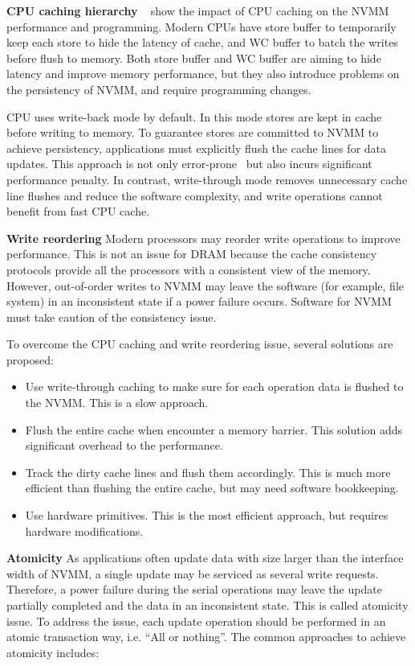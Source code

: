 \textbf{CPU caching hierarchy}
~\cite{CPUcaching} show the impact of CPU caching on the NVMM performance
and programming. Modern CPUs have store buffer to temporarily keep each store
to hide the latency of cache, and WC buffer to batch the writes before
flush to memory. Both store buffer and WC buffer are aiming to hide latency
and improve memory performance, but they also introduce problems on the
persistency of NVMM, and require programming changes.

CPU uses write-back mode by default. In this mode stores are kept in cache
before writing to memory. To guarantee stores are committed to NVMM to achieve
persistency, applications must explicitly flush the cache lines for data
updates. This approach is not only error-prone~\cite{singlelock}
but also incurs significant
performance penalty. In contrast, write-through mode removes unnecessary
cache line flushes and reduce the software complexity, and write operations
cannot benefit from fast CPU cache.

\textbf{Write reordering} Modern processors may reorder write operations to improve
performance. This is not an issue for DRAM because the cache consistency
protocols provide all the processors with a consistent view of the memory.
However, out-of-order writes to NVMM may leave the software (for example,
file system) in an inconsistent state if a power failure occurs. Software
for NVMM must take caution of the consistency issue. 

To overcome the CPU caching and write reordering issue,
several solutions are proposed:

\begin{itemize}
\item Use write-through caching to make sure for each operation
data is flushed to the NVMM. This is a slow approach. 
\item Flush the entire cache when encounter a memory barrier. This solution
adds significant overhead to the performance.
\item Track the dirty cache lines and flush them accordingly. This is much
more efficient than flushing the entire cache, but may need software bookkeeping.
\item Use hardware primitives. This is the most efficient approach, but requires
hardware modifications.
\end{itemize}

\textbf{Atomicity}
As applications often update data with size larger than the interface width
of NVMM, a single update may be serviced as several write requests. Therefore,
a power failure during the serial operations may leave the update partially
completed and the data in an inconsistent state. This is called atomicity issue.
To address the issue, each update operation should be performed in an atomic
transaction way, i.e. ``All or nothing''.
The common approaches to achieve atomicity includes:


